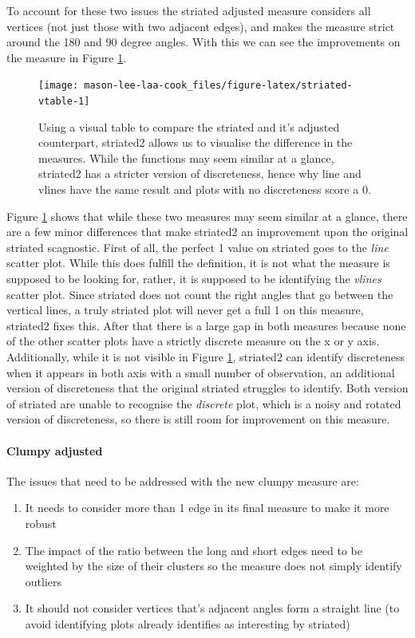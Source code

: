 To account for these two issues the striated adjusted measure considers all vertices (not just those with two adjacent edges), and makes the measure strict around the 180 and 90 degree angles. With this we can see the improvements on the measure in Figure \ref{fig:striated-vtable}.

\begin{figure}
\texttt{[image: mason-lee-laa-cook\_files/figure-latex/striated-vtable-1]} \caption{Using a visual table to compare the striated and it's adjusted counterpart, striated2 allows us to visualise the difference in the measures. While the functions may seem similar at a glance, striated2 has a stricter version of discreteness, hence why line and vlines have the same result and plots with no discreteness score a 0.}\label{fig:striated-vtable}
\end{figure}

Figure \ref{fig:striated-vtable} shows that while these two measures may seem similar at a glance, there are a few minor differences that make striated2 an improvement upon the original striated scagnostic. First of all, the perfect 1 value on striated goes to the \emph{line} scatter plot. While this does fulfill the definition, it is not what the measure is supposed to be looking for, rather, it is supposed to be identifying the \emph{vlines} scatter plot. Since striated does not count the right angles that go between the vertical lines, a truly striated plot will never get a full 1 on this measure, striated2 fixes this. After that there is a large gap in both measures because none of the other scatter plots have a strictly discrete measure on the x or y axis. Additionally, while it is not visible in Figure \ref{fig:striated-vtable}, striated2 can identify discreteness when it appears in both axis with a small number of observation, an additional version of discreteness that the original striated struggles to identify. Both version of striated are unable to recognise the \emph{discrete} plot, which is a noisy and rotated version of discreteness, so there is still room for improvement on this measure.

\paragraph{Clumpy adjusted}\label{clumpy-adjusted}

The issues that need to be addressed with the new clumpy measure are:

\begin{enumerate}
\def\labelenumi{\arabic{enumi}.}
\tightlist
\item
  It needs to consider more than 1 edge in its final measure to make it more robust
\item
  The impact of the ratio between the long and short edges need to be weighted by the size of their clusters so the measure does not simply identify outliers
\item
  It should not consider vertices that's adjacent angles form a straight line (to avoid identifying plots already identifies as interesting by striated)
\end{enumerate}

